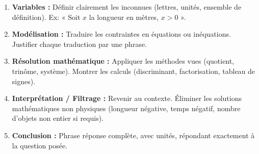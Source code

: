 \documentclass[11pt]{article}
\begin{document}
\begin{methode}
    \begin{enumerate}
        \item \textbf{Variables :} Définir clairement les inconnues (lettres, unités, ensemble de définition). Ex: « Soit $x$ la longueur en mètres, $x>0$ ».
        \item \textbf{Modélisation :} Traduire les contraintes en équations ou inéquations. Justifier chaque traduction par une phrase.
        \item \textbf{Résolution mathématique :} Appliquer les méthodes vues (quotient, trinôme, système). Montrer les calculs (discriminant, factorisation, tableau de signes).
        \item \textbf{Interprétation / Filtrage :} Revenir au contexte. Éliminer les solutions mathématiques non physiques (longueur négative, temps négatif, nombre d'objets non entier si requis).
        \item \textbf{Conclusion :} Phrase réponse complète, avec unités, répondant exactement à la question posée.
    \end{enumerate}
\end{methode}
\end{document}
